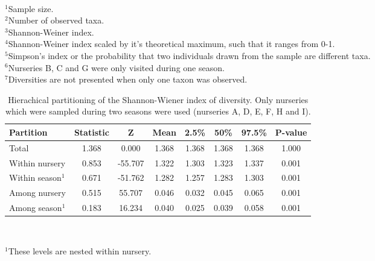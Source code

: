 \documentclass[12pt]{article}
\begin{document}
\begin{table}[ht]
\begin{tabular}{ccccccc}
   \hline
\end{tabular}
\\
\vspace{12pt}
\raggedright
$^{1}$Sample size.\\
$^{2}$Number of observed taxa.\\
$^{3}$Shannon-Weiner index.\\
$^{4}$Shannon-Weiner index scaled by it's theoretical maximum, such that it ranges from 0-1.\\
$^{5}$Simpson's index or the probability that two individuals drawn from the sample are different taxa.\\
$^{6}$Nurseries B, C and G were only visited during one season.\\
$^{7}$Diversities are not presented when only one taxon was observed. \\
\end{table}


\begin{table}[ht]
\centering
\caption{Hierachical partitioning of the Shannon-Wiener index of diversity. Only nurseries which were sampled during two seasons were used (nurseries A, D, E, F, H and I).} 
\label{tab:adipart}
\begin{tabular}{lccccccc}
  \hline
  \textbf{Partition} & \textbf{Statistic} & \textbf{Z} & \textbf{Mean} & \textbf{2.5\%} & \textbf{50\%} & \textbf{97.5\%} & \textbf{P-value} \\ 
  \hline
  Total & 1.368 & 0.000 & 1.368 & 1.368 & 1.368 & 1.368 & 1.000 \\ 
  Within nursery & 0.853 & -55.707 & 1.322 & 1.303 & 1.323 & 1.337 & 0.001 \\ 
  Within season$^{1}$ & 0.671 & -51.762 & 1.282 & 1.257 & 1.283 & 1.303 & 0.001 \\ 
  Among nursery & 0.515 & 55.707 & 0.046 & 0.032 & 0.045 & 0.065 & 0.001 \\ 
  Among season$^{1}$ & 0.183 & 16.234 & 0.040 & 0.025 & 0.039 & 0.058 & 0.001 \\ 
   \hline
\end{tabular}
\\
\vspace{12pt}
\raggedright
$^{1}$These levels are nested within nursery.
\end{table}
\end{document}
